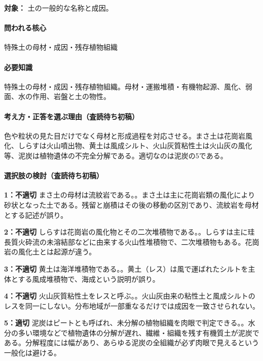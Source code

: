 \noindent\textbf{対象：} 土の一般的な名称と成因。\par

\paragraph{問われる核心} 特殊土の母材・成因・残存植物組織

\paragraph{必要知識} 特殊土の母材・成因・残存植物組織。母材・運搬堆積・有機物起源、風化、弱面、水の作用、岩盤と土の物性。

\paragraph{考え方・正答を選ぶ理由（査読待ち初稿）} 色や粒状の見た目だけでなく母材と形成過程を対応させる。まさ土は花崗岩風化、しらすは火山噴出物、黄土は風成シルト、火山灰質粘性土は火山灰の風化等、泥炭は植物遺体の不完全分解である。適切なのは泥炭の5である。

\paragraph{選択肢の検討（査読待ち初稿）}\mbox{}\par

\noindent\textbf{1：不適切} まさ土の母材は流紋岩である。。まさ土は主に花崗岩類の風化により砂状となった土である。残留と崩積はその後の移動の区別であり、流紋岩を母材とする記述が誤り。\par

\noindent\textbf{2：不適切} しらすは花崗岩の風化物とその二次堆積物である。。しらすは主に珪長質火砕流の未溶結部などに由来する火山性堆積物で、二次堆積物もある。花崗岩の風化土とは起源が違う。\par

\noindent\textbf{3：不適切} 黄土は海洋堆積物である。。黄土（レス）は風で運ばれたシルトを主体とする風成堆積物で、海成という説明が誤り。\par

\noindent\textbf{4：不適切} 火山灰質粘性土をレスと呼ぶ。。火山灰由来の粘性土と風成シルトのレスを同一にしない。分布地域が一部重なるだけでは成因を一致させられない。\par

\noindent\textbf{5：適切} 泥炭はピートとも呼ばれ、未分解の植物組織を肉眼で判定できる。。水分の多い環境などで植物遺体の分解が遅れ、繊維・組織を残す有機質土が泥炭である。分解程度には幅があり、あらゆる泥炭の全組織が必ず肉眼で見えるという一般化は避ける。\par

